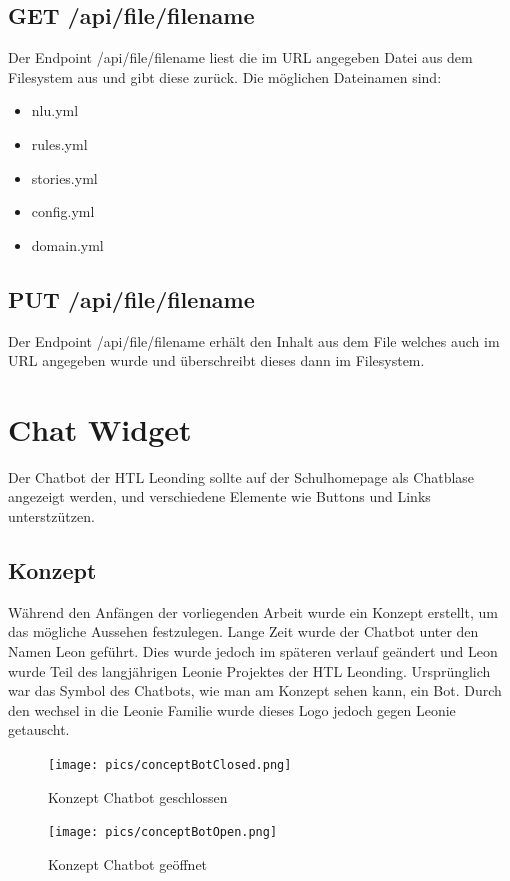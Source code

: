 \subsection{GET /api/file/{filename}}
Der Endpoint /api/file/{filename} liest die im URL angegeben Datei aus dem Filesystem aus und gibt diese zurück.
Die möglichen Dateinamen sind:

\begin{itemize}
    \item nlu.yml
    \item rules.yml
    \item stories.yml
    \item config.yml
    \item domain.yml
\end{itemize}

\subsection{PUT /api/file/{filename}}
Der Endpoint /api/file/{filename} erhält den Inhalt aus dem File welches auch im URL angegeben wurde und überschreibt dieses dann im Filesystem.

\section{Chat Widget}\label{sec:chat-widget}
Der Chatbot der HTL Leonding sollte auf der Schulhomepage als Chatblase angezeigt werden, und verschiedene Elemente wie Buttons und Links unterstzützen.

\subsection{Konzept}
Während den Anfängen der vorliegenden Arbeit wurde ein Konzept erstellt, um das mögliche Aussehen festzulegen. Lange Zeit wurde der Chatbot unter den Namen Leon geführt.
Dies wurde jedoch im späteren verlauf geändert und Leon wurde Teil des langjährigen Leonie Projektes der HTL Leonding.
Ursprünglich war das Symbol des Chatbots, wie man am Konzept sehen kann, ein Bot. Durch den wechsel in die Leonie Familie wurde dieses Logo jedoch gegen Leonie getauscht.
\begin{figure}[hbt!]
    \centering
    \texttt{[image: pics/conceptBotClosed.png]}
    \caption{Konzept Chatbot geschlossen}
    \label{fig:impl:conceptBotClosed}
\end{figure}
\begin{figure}[hbt!]
    \centering
    \texttt{[image: pics/conceptBotOpen.png]}
    \caption{Konzept Chatbot geöffnet}
    \label{fig:impl:conceptBotOpen}
\end{figure}

